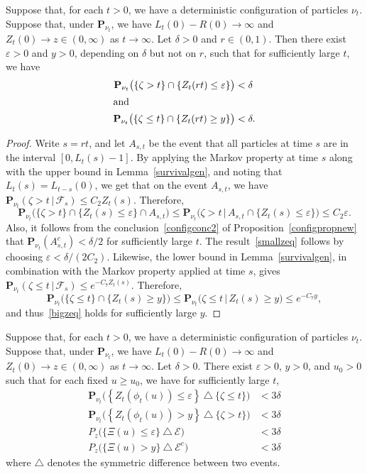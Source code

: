 \documentclass[AHL,Unicode,longabstracts,published]{cedram}
\newcommand*\eps{\varepsilon}
\renewcommand*\P{\mathbf{P}}
\newcommand\F{\mathcal{F}}
\newcommand{\clE}{\mathcal{E}}
\newcommand{\1} {\mathds{1}}
\begin{document}
\begin{lemm}\label{zrare}
Suppose that, for each $t > 0$, we have a deterministic configuration of particles $\nu_t$. Suppose that, under $\P_{\nu_t}$, we have $L_t(0) - R(0) \rightarrow \infty$ and $Z_t(0) \rightarrow z \in (0, \infty)$ as $t \rightarrow \infty$. Let $\delta > 0$ and $r \in (0, 1)$. Then there exist $\eps > 0$ and $y > 0$, depending on $\delta$ but not on $r$, such that for sufficiently large $t$, we have
\begin{align}
\P_{\nu_t}\big(\{\zeta > t\} \cap \{Z_t(rt) \leq \eps\}\big) &< \delta
\label{smallzeq}\\
\intertext{and}
\P_{\nu_t}\big(\{\zeta \leq t\} \cap \{Z_t(rt) \geq y\}\big) &< \delta.\label{bigzeq}
\end{align}
\end{lemm}

\begin{proof}
Write $s = rt$, and let $A_{s,t}$ be the event that all particles at time $s$ are in the interval $[0, L_t(s) - 1]$. By applying the Markov property at time $s$ along with the upper bound in Lemma~\ref{survivalgen}, and noting that $L_t(s) = L_{t-s}(0)$, we get that on the event $A_{s,t}$, we have $\P_{\nu_t}(\zeta > t \,|\, \F_s) \leq C_2 Z_t(s)$. Therefore,
\[
\P_{\nu_t}\big(\{\zeta > t\} \cap \{Z_t(s) \leq \eps\} \cap A_{s,t}\big) \leq \P_{\nu_t}\big(\zeta > t \,\big|\, A_{s,t} \cap \{Z_t(s) \leq \eps\}\big) \leq C_2 \eps.
\]
Also, it follows from the conclusion~\eqref{configconc2} of Proposition~\ref{configpropnew} that $\P_{\nu_t}(A_{s,t}^c) < \delta/2$ for sufficiently large $t$. The result~\eqref{smallzeq} follows by choosing $\eps < \delta/(2C_2)$. Likewise, the lower bound in Lemma~\ref{survivalgen}, in combination with the Markov property applied at time $s$, gives $\P_{\nu_t}(\zeta \leq t \,|\, \F_s) \leq e^{-C_7 Z_t(s)}$. Therefore,
\[
\P_{\nu_t}\big(\{\zeta \leq t\} \cap \{Z_t(s) \geq y\}\big) \leq \P_{\nu_t}\big(\zeta \leq t \,\big|\, Z_t(s) \geq y\big)\leq e^{-C_7 y},
\]
and thus~\eqref{bigzeq} holds for sufficiently large $y$.
\end{proof}

\begin{lemm}\label{trilem}
Suppose that, for each $t > 0$, we have a deterministic configuration of particles $\nu_t$. Suppose that, under $\P_{\nu_t}$, we have $L_t(0) - R(0) \rightarrow \infty$ and $Z_t(0) \rightarrow z \in (0, \infty)$ as $t \rightarrow \infty$. Let $\delta > 0$. There exist $\eps > 0$, $y > 0$, and $u_0 > 0$ such that for each fixed $u \geq u_0$, we have for sufficiently large $t$,
\begin{align*}
\P_{\nu_t}\big(\left\{Z_t(\phi_t(u)) \leq \eps\right\} \: \triangle \: \{\zeta \leq t\}\big) &< 3\delta \\
\P_{\nu_t}\big(\left\{Z_t(\phi_t(u)) > y\right\} \: \triangle \: \{\zeta > t\}\big) &< 3\delta \\
P_z\big(\{\Xi(u) \leq \eps\} \: \triangle \: \clE\big) &< 3\delta \\
P_z\big(\{\Xi(u) > y\} \: \triangle \: \clE^c\big) &< 3\delta
\end{align*}
where $\triangle$ denotes the symmetric difference between two events.
\end{lemm}
\end{document}
